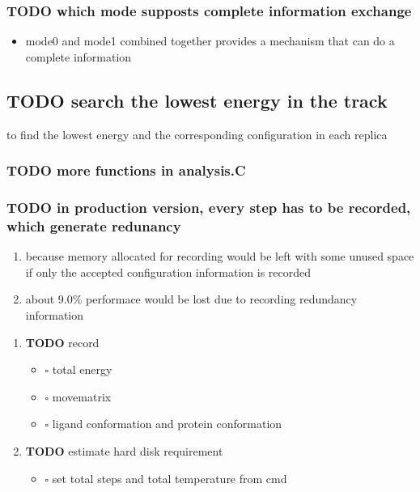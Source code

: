 \documentclass[11pt]{article}
\begin{document}
\subsubsection{{\bfseries\sffamily TODO} which mode supposts complete information exchange}
\label{sec-3-1-2}
\begin{itemize}
\item mode0 and mode1 combined together provides a mechanism that can do a complete information
\end{itemize}

\subsection{{\bfseries\sffamily TODO} search the lowest energy in the track}
\label{sec-3-2}
to find the lowest energy and the corresponding configuration in each replica

\subsubsection{{\bfseries\sffamily TODO} more functions in analysis.C}
\label{sec-3-2-1}

\subsubsection{{\bfseries\sffamily TODO} in production version, every step has to be recorded, which generate redunancy}
\label{sec-3-2-2}
\begin{enumerate}
\item because memory allocated for recording would be left with some unused space 
if only the accepted configuration information is recorded
\item about 9.0\% performace would be lost due to recording redundancy information
\end{enumerate}
\begin{enumerate}
\item {\bfseries\sffamily TODO} record
\label{sec-3-2-2-1}
\begin{itemize}
\item $\square$ total energy
\item $\square$ movematrix
\item $\square$ ligand conformation and protein conformation
\end{itemize}

\item {\bfseries\sffamily TODO} estimate hard disk requirement
\label{sec-3-2-2-2}
\begin{itemize}
\item $\square$ set total steps and total temperature from cmd
\end{itemize}
\end{enumerate}
\end{document}
